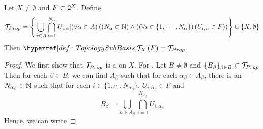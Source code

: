 \begin{prop}
    \label{prop:CharacterizationOfGeneratedTopoology}
    Let $X \neq \emptyset$ 
    and $F \subset 2^{X}$. 
    Define 
    \begin{equation*}
    \mathcal{T}_{Prop}=\left\{\bigcup\limits_{\alpha \in A} \bigcap\limits_{i=1}^{N_\alpha} U_{i, \alpha} |(\forall \alpha \in A)\left((N_\alpha \in \mathbb{N})\wedge \left( (\forall i \in \{1, \cdots, N_\alpha\}\right) \left( U_{i, \alpha} \in F\right)\right) \right\}\cup \{X, \emptyset\}
    \end{equation*}
    Then 
    $\scGeneratedTopology{X}{F} = \T_{Prop}$.
    \begin{proof}
        We first show that $\mathcal{T}_{Prop}$ is a
        \Topology
        on $X$. 
        For 
        \ClosureUnderUnions, 
        Let $B \neq \emptyset$ 
        and $\{B_\beta\}_{\beta \in B} \subset \mathcal{T}_{Prop}$
        Then for each $\beta \in B$, we can find $A_{\beta}$
        such that for each $\alpha_{\beta} \in A_{\beta}$, 
        there is an $N_{\alpha_{\beta}} \in \mathbb{N}$ 
        such that for each $i \in \{1, \cdots, N_{\alpha_\beta}\}$, 
        $U_{i, \alpha_\beta} \in F$ and
        \begin{equation}
            B_{\beta} = \bigcup\limits_{\alpha \in A_\beta} \bigcap\limits_{i=1}^{N_{\alpha_\beta}}U_{i, \alpha_\beta}
        \end{equation}
        Hence, we can write
         

\end{proof}
\end{prop}
